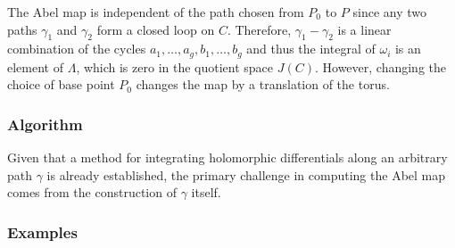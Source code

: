 The Abel map is independent of the path chosen from $P_0$ to $P$ since
any two paths $\gamma_1$ and $\gamma_2$ form a closed loop on
$C$. Therefore, $\gamma_1 - \gamma_2$ is a linear combination of the
cycles $a_1,\ldots,a_g,b_1,\ldots,b_g$ and thus the integral of
$\omega_i$ is an element of $\Lambda$, which is zero in the quotient
space $J(C)$. However, changing the choice of base point $P_0$ changes
the map by a translation of the torus.

%
\subsubsection*{Algorithm}
%

Given that a method for integrating holomorphic differentials along an
arbitrary path $\gamma$ is already established, the primary challenge in
computing the Abel map comes from the construction of $\gamma$ itself.


%
\subsubsection*{Examples}
%
